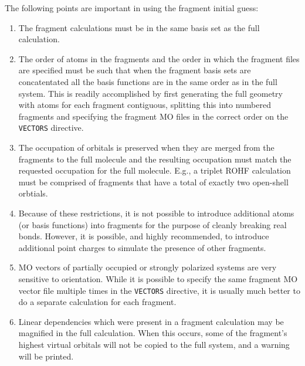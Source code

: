 The following points are important in using the fragment initial guess:
\begin{enumerate}
\item The fragment calculations must be in the same basis set as the
  full calculation.
\item The order of atoms in the fragments and the order in which the
  fragment files are specified must be such that when the fragment
  basis sets are concatentated all the basis functions are in the same
  order as in the full system.  This is readily accomplished by first
  generating the full geometry with atoms for each fragment
  contiguous, splitting this into numbered fragments and specifying
  the fragment MO files in the correct order on the \verb+VECTORS+
  directive.
\item The occupation of orbitals is preserved when they are merged
  from the fragments to the full molecule and the resulting occupation
  must match the requested occupation for the full molecule.  E.g., a
  triplet ROHF calculation must be comprised of fragments that have
  a total of exactly two open-shell orbtials. 
\item Because of these restrictions, it is not possible to introduce
  additional atoms (or basis functions) into fragments for the purpose
  of cleanly breaking real bonds.  However, it is possible, and highly
  recommended, to introduce additional point charges to simulate the
  presence of other fragments.
\item MO vectors of partially occupied or strongly polarized systems
  are very sensitive to orientation.  While it is possible to specify
  the same fragment MO vector file multiple times in the
  \verb+VECTORS+ directive, it is usually much better to do a separate
  calculation for each fragment.
\item Linear dependencies which were present in a fragment calculation
  may be magnified in the full calculation.  When this occurs, 
  some of the fragment's highest virtual orbitals will not be copied to the
  full system, and a warning will be printed.
  
\end{enumerate}

